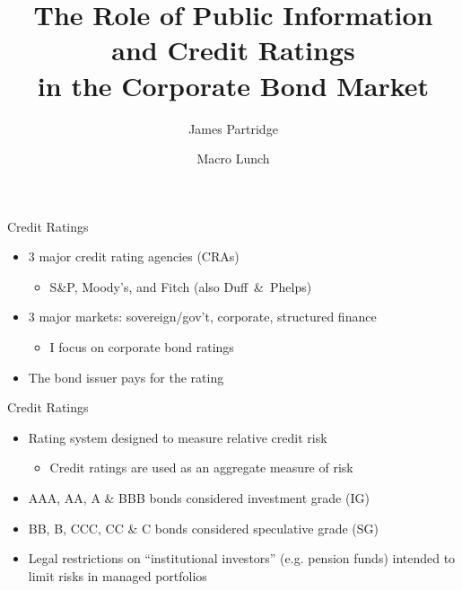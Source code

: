 \documentclass{beamer}
\title[Information, Ratings and Corporate Bonds]{The Role of Public Information and Credit Ratings\\in the Corporate Bond Market}
\author[JGP]{James Partridge}
\institute[UWO]{The University of Western Ontario}
\date[August 18, 2012]{Macro Lunch}
\begin{document}
\begin{frame}[plain]%
\titlepage
\end{frame}

\begin{frame}{Credit Ratings}
\begin{itemize}
	\item 3 major credit rating agencies (CRAs)
	\begin{itemize}
		\item S\&P, Moody's, and Fitch (also Duff~\&~Phelps)
	\end{itemize}
	\item 3 major markets: sovereign/gov't, corporate, structured finance
	\begin{itemize}
		\item I focus on corporate bond ratings
	\end{itemize}
	\item The bond issuer pays for the rating
\end{itemize}
\end{frame}

\begin{frame}{Credit Ratings}
\begin{itemize}
	\item Rating system designed to measure relative credit risk
	\begin{itemize}
		\item Credit ratings are used as an aggregate measure of risk
	\end{itemize}
	\item AAA, AA, A \& BBB bonds considered investment grade (IG)
	\item BB, B, CCC, CC \& C bonds considered speculative grade (SG)
	\item Legal restrictions on ``institutional investors'' (e.g. pension funds) intended to limit risks in managed portfolios
\end{itemize}
\end{frame}
\end{document}
